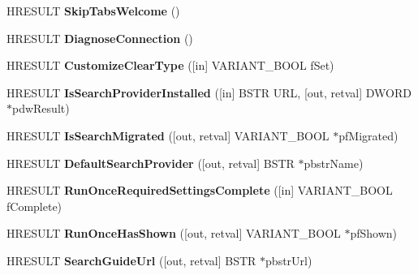 \begin{DoxyCompactItemize}
\item 
\mbox{\label{interface_s_h_doc_vw_1_1_i_shell_u_i_helper2_aaaedddef9dedb62131527a44a14bdfec}} 
H\+R\+E\+S\+U\+LT {\bfseries Skip\+Tabs\+Welcome} ()
\item 
\mbox{\label{interface_s_h_doc_vw_1_1_i_shell_u_i_helper2_a92707330f5c2905b7dfac6263e6241d2}} 
H\+R\+E\+S\+U\+LT {\bfseries Diagnose\+Connection} ()
\item 
\mbox{\label{interface_s_h_doc_vw_1_1_i_shell_u_i_helper2_a6446d7b94be75b84ba2e733860c8c774}} 
H\+R\+E\+S\+U\+LT {\bfseries Customize\+Clear\+Type} (\mbox{[}in\mbox{]} V\+A\+R\+I\+A\+N\+T\+\_\+\+B\+O\+OL f\+Set)
\item 
\mbox{\label{interface_s_h_doc_vw_1_1_i_shell_u_i_helper2_aa41366cf6063818c49654e46850e643a}} 
H\+R\+E\+S\+U\+LT {\bfseries Is\+Search\+Provider\+Installed} (\mbox{[}in\mbox{]} B\+S\+TR U\+RL, \mbox{[}out, retval\mbox{]} D\+W\+O\+RD $\ast$pdw\+Result)
\item 
\mbox{\label{interface_s_h_doc_vw_1_1_i_shell_u_i_helper2_a0a23d45075631bd94fa5697f3e8f1d85}} 
H\+R\+E\+S\+U\+LT {\bfseries Is\+Search\+Migrated} (\mbox{[}out, retval\mbox{]} V\+A\+R\+I\+A\+N\+T\+\_\+\+B\+O\+OL $\ast$pf\+Migrated)
\item 
\mbox{\label{interface_s_h_doc_vw_1_1_i_shell_u_i_helper2_af5d1bd581439d7c56a87f70096b3e08c}} 
H\+R\+E\+S\+U\+LT {\bfseries Default\+Search\+Provider} (\mbox{[}out, retval\mbox{]} B\+S\+TR $\ast$pbstr\+Name)
\item 
\mbox{\label{interface_s_h_doc_vw_1_1_i_shell_u_i_helper2_a98a14237a8fee2e8a2e80cc1759fe358}} 
H\+R\+E\+S\+U\+LT {\bfseries Run\+Once\+Required\+Settings\+Complete} (\mbox{[}in\mbox{]} V\+A\+R\+I\+A\+N\+T\+\_\+\+B\+O\+OL f\+Complete)
\item 
\mbox{\label{interface_s_h_doc_vw_1_1_i_shell_u_i_helper2_ab108752957cbfd41c42b9930f64dd4c8}} 
H\+R\+E\+S\+U\+LT {\bfseries Run\+Once\+Has\+Shown} (\mbox{[}out, retval\mbox{]} V\+A\+R\+I\+A\+N\+T\+\_\+\+B\+O\+OL $\ast$pf\+Shown)
\item 
\mbox{\label{interface_s_h_doc_vw_1_1_i_shell_u_i_helper2_ac5d49b1c8765a23c19156a55ecdef40e}} 
H\+R\+E\+S\+U\+LT {\bfseries Search\+Guide\+Url} (\mbox{[}out, retval\mbox{]} B\+S\+TR $\ast$pbstr\+Url)
\end{DoxyCompactItemize}
